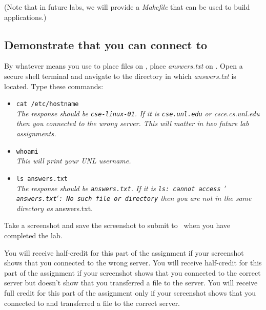 (Note that in future labs, we will provide a \textit{Makefile} that can be used to build applications.)

\subsection*{Demonstrate that you can connect to \runtimeenvironment}

By whatever means you use to place files on \runtimeenvironment, place \textit{answers.txt} on \runtimeenvironment.
Open a secure shell terminal and navigate to the directory in which \textit{answers.txt} is located.
Type these commands:
\begin{itemize}
    \item[]\texttt{cat /etc/hostname} \\
    \textit{The response should be \texttt{cse-linux-01}.                   %
    If it is \texttt{cse.unl.edu} or \textit{csce.cs.unl.edu} then you connected to the wrong server.   %
    This will matter in two future lab assignments.}
    \item[]\texttt{whoami} \\
    \textit{This will print your UNL username.}
    \item[]\texttt{ls answers.txt} \\
    \textit{The response should be \texttt{answers.txt}.
    If it is \texttt{ls: cannot access $'$answers.txt$'$: No such file or directory} then you are not in the same directory as} answers.txt.
\end{itemize}

Take a screenshot and save the screenshot to submit to \filesubmission\ when you have completed the lab.

You will receive half-credit for this part of the assignment if your screenshot shows that you connected to the wrong server.
You will receive half-credit for this part of the assignment if your screenshot shows that you connected to the correct server but doesn't show that you transferred a file to the server.
You will receive full credit for this part of the assignment only if your screenshot shows that you connected to and transferred a file to the correct server.
